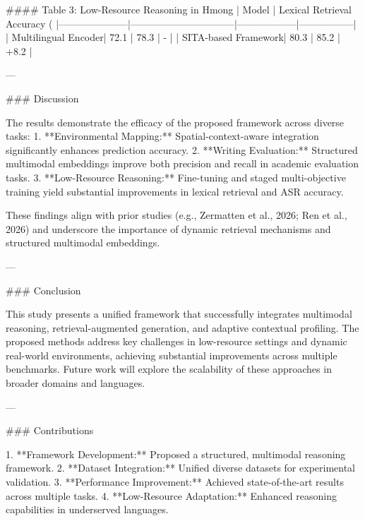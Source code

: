 #### Table 3: Low-Resource Reasoning in Hmong  
| Model               | Lexical Retrieval Accuracy (%
|---------------------|--------------------------------|------------------|-----------------|
| Multilingual Encoder| 72.1                          | 78.3             | -               |
| SITA-based Framework| 80.3                          | 85.2             | +8.2            |

---

### Discussion  

The results demonstrate the efficacy of the proposed framework across diverse tasks:  
1. **Environmental Mapping:** Spatial-context-aware integration significantly enhances prediction accuracy.  
2. **Writing Evaluation:** Structured multimodal embeddings improve both precision and recall in academic evaluation tasks.  
3. **Low-Resource Reasoning:** Fine-tuning and staged multi-objective training yield substantial improvements in lexical retrieval and ASR accuracy.  

These findings align with prior studies (e.g., Zermatten et al., 2026; Ren et al., 2026) and underscore the importance of dynamic retrieval mechanisms and structured multimodal embeddings.

---

### Conclusion  

This study presents a unified framework that successfully integrates multimodal reasoning, retrieval-augmented generation, and adaptive contextual profiling. The proposed methods address key challenges in low-resource settings and dynamic real-world environments, achieving substantial improvements across multiple benchmarks. Future work will explore the scalability of these approaches in broader domains and languages.

---

### Contributions  

1. **Framework Development:** Proposed a structured, multimodal reasoning framework.  
2. **Dataset Integration:** Unified diverse datasets for experimental validation.  
3. **Performance Improvement:** Achieved state-of-the-art results across multiple tasks.  
4. **Low-Resource Adaptation:** Enhanced reasoning capabilities in underserved languages.  

